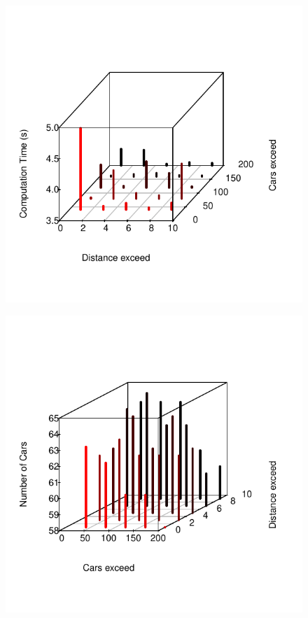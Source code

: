 \documentclass[12]{article}
\begin{document}
\begin{figure}[H]
  \captionsetup{justification=centering}
   \centering
    \includegraphics[scale=0.8]{Results/data_6_1.pdf}
      \caption{}
      \label{fig:data_6_1}
  \end{figure}
    \vspace{1cm}

\begin{figure}[H]
  \captionsetup{justification=centering}
   \centering
    \includegraphics[scale=0.8]{Results/data_6_2.pdf}
      \caption{}
      \label{fig:data_6_2}
  \end{figure}
    \vspace{1cm}
\end{document}
